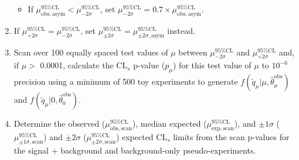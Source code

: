 \documentclass[dissertation.tex]{subfiles}
\begin{document}
\begin{enumerate}
\begin{itemize}
\item If $\mu^{95\%\mathrm{CL}}_{\mathrm{obs,asym}} < \mu^{95\%\mathrm{CL}}_{-2\sigma}$, set $\mu^{95\%\mathrm{CL}}_{-2\sigma} = 0.7\times\mu^{95\%\mathrm{CL}}_{\mathrm{obs,asym}}$.
\end{itemize}
\item If $\mu^{95\%\mathrm{CL}}_{+2\sigma} = \mu^{95\%\mathrm{CL}}_{-2\sigma}$, set $\mu^{95\%\mathrm{CL}}_{\pm2\sigma} = \mu^{95\%\mathrm{CL}}_{\pm2\sigma\mathrm{,asym}}$ instead.
\item Scan over 100 equally spaced test values of $\mu$ between $\mu^{95\%\mathrm{CL}}_{-2\sigma}$ and $\mu^{95\%\mathrm{CL}}_{+2\sigma}$ and, if $\mu >$ 0.0001, calculate the $\mbox{CL}_{s}$ p-value ($p_{\mu}$) for this test value of $\mu$ to $10^{-6}$ precision using a minimum of 500 toy experiments to generate $f(\tilde{q}_{\mu} | \mu, \hat{\theta}_{\mu}^{\mathrm{obs}})$ and $f(\tilde{q}_{\mu} | 0, \hat{\theta}_{0}^{\mathrm{obs}})$.
\item Determine the observed ($\mu^{95\%\mathrm{CL}}_{\mathrm{obs,scan}}$), median expected ($\mu^{95\%\mathrm{CL}}_{\mathrm{exp,scan}}$), and $\pm1\sigma$ ($\mu^{95\%\mathrm{CL}}_{\pm1\sigma\mathrm{,scan}}$) and $\pm2\sigma$ ($\mu^{95\%\mathrm{CL}}_{\pm2\sigma\mathrm{,scan}}$) expected $\mbox{CL}_{s}$ limits from the scan p-values for the signal + background and background-only pseudo-experiments.
\end{enumerate}


\end{document}
